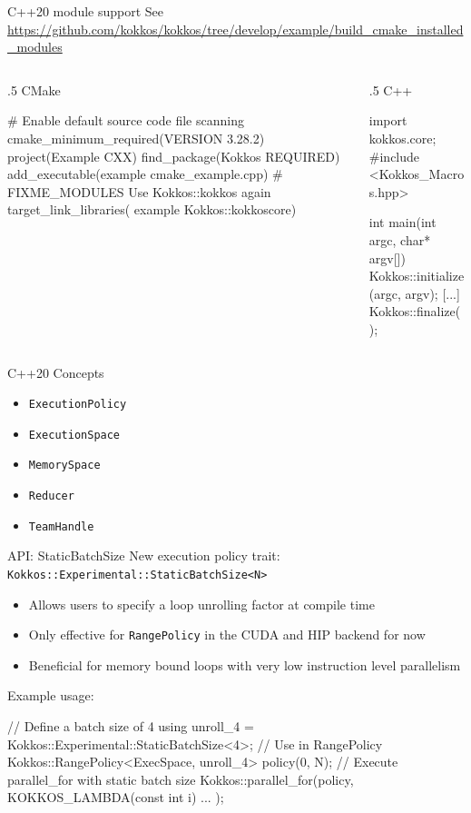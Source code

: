 \begin{frame}[fragile]{C++20 module support}
See \url{https://github.com/kokkos/kokkos/tree/develop/example/build_cmake_installed_modules}
\newline
\begin{columns}
\begin{column}{.5\linewidth}
CMake
\begin{code}
# Enable default source code file scanning
cmake_minimum_required(VERSION 3.28.2)
project(Example CXX)
find_package(Kokkos REQUIRED)
add_executable(example cmake_example.cpp)
# FIXME_MODULES Use Kokkos::kokkos again
target_link_libraries(
  example 
  Kokkos::kokkoscore)
\end{code}
\end{column}
\begin{column}{.5\linewidth}
C++
\begin{code}
import kokkos.core;
#include <Kokkos_Macros.hpp>

int main(int argc, char* argv[]) {
  Kokkos::initialize(argc, argv);
  [...]
  Kokkos::finalize();
}
\end{code}
\end{column}
\end{columns}
\end{frame}

\begin{frame}[fragile]{C++20 Concepts}
\begin{itemize}
\item \texttt{ExecutionPolicy}
\item \texttt{ExecutionSpace}
\item \texttt{MemorySpace}
\item \texttt{Reducer}
\item \texttt{TeamHandle}
\end{itemize}
\end{frame}

\begin{frame}[fragile]{API: StaticBatchSize}
  New execution policy trait: \texttt{Kokkos::Experimental::StaticBatchSize<N>}
  \begin{itemize}
    \item Allows users to specify a loop unrolling factor at compile time
    \item Only effective for \texttt{RangePolicy} in the CUDA and HIP backend for now
    \item Beneficial for memory bound loops with very low instruction level parallelism
  \end{itemize}
  Example usage:
  \begin{code}[keywords={using,auto}]
    // Define a batch size of 4
    using unroll_4 = Kokkos::Experimental::StaticBatchSize<4>;
    // Use in RangePolicy
    Kokkos::RangePolicy<ExecSpace, unroll_4> policy(0, N);
    // Execute parallel_for with static batch size
    Kokkos::parallel_for(policy, KOKKOS_LAMBDA(const int i) {
      ...
    });
  \end{code}
\end{frame}

